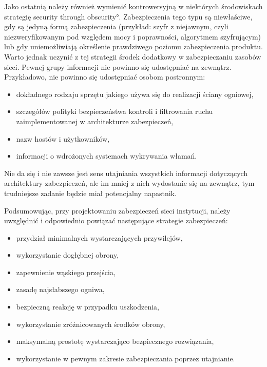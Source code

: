 Jako ostatnią należy również wymienić kontrowersyjną w niektórych
środowiskach strategię  \ang{security
through obscurity}. Zabezpieczenia tego typu są niewłaściwe, gdy są jedyną
formą zabezpieczenia (przykład: szyfr z niejawnym, czyli niezweryfikowanym
pod względem mocy i poprawności, algorytmem szyfrującym) lub gdy
uniemożliwiają określenie prawdziwego poziomu zabezpieczenia produktu. Warto
jednak uczynić z tej strategii środek dodatkowy w zabezpieczaniu zasobów
sieci. Pewnej grupy informacji nie powinno się udostępniać na zewnątrz.
Przykładowo, nie powinno się udostępniać osobom postronnym:

\begin{itemize}

\item dokładnego rodzaju sprzętu jakiego używa się do realizacji ściany
ogniowej,

\item szczegółów polityki bezpieczeństwa kontroli i filtrowania ruchu
zaimplementowanej w architekturze zabezpieczeń,

\item nazw hostów i użytkowników,

\item informacji o wdrożonych systemach wykrywania włamań.

\end{itemize}

Nie da się i nie zawsze jest sens utajniania wszystkich informacji
dotyczących architektury zabezpieczeń, ale im mniej z nich wydostanie się na
zewnątrz, tym trudniejsze zadanie będzie miał potencjalny napastnik.

Podsumowując, przy projektowaniu zabezpieczeń sieci instytucji, należy
uwz\-ględnić i odpowiednio powiązać następujące strategie zabezpieczeń:

\begin{itemize}

\item przydział minimalnych wystarczających przywilejów,

\item wykorzystanie dogłębnej obrony,

\item zapewnienie wąskiego przejścia,

\item zasadę najsłabszego ogniwa,

\item bezpieczną reakcję w przypadku uszkodzenia,

\item wykorzystanie zróżnicowanych środków obrony,

\item maksymalną prostotę wystarczająco bezpiecznego rozwiązania,

\item wykorzystanie w pewnym zakresie zabezpieczania poprzez utajnianie.

\end{itemize}


